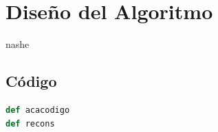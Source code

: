 \section{Diseño del Algoritmo}

nashe

\subsection{Código}\label{rec:codigo} %

\begin{lstlisting}[mathescape=true, language=Python]
def acacodigo
def recons

\end{lstlisting}

